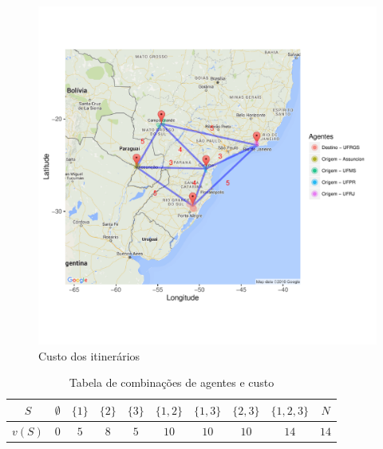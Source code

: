 \documentclass[
	article,			        %
	11pt,				          %
	oneside,			        %
	a4paper,			        %
	english,			        %
	brazil,				        %
	sumario=tradicional
]{abntex2}\usepackage[]{graphicx}\usepackage[]{color}
\makeatletter
\def\maxwidth{ %
  \ifdim\Gin@nat@width>\linewidth
    \linewidth
  \else
    \Gin@nat@width
  \fi
}
\newenvironment{knitrout}{}{} %
\makeatother
\begin{document}
\begin{knitrout}
\color{fgcolor}\begin{figure}[H]

{\centering \includegraphics[width=\maxwidth]{figure/unnamed-chunk-2-1} 

}

\caption[Custo dos itinerários]{Custo dos itinerários}\label{fig:unnamed-chunk-2}
\end{figure}


\end{knitrout}

\begin{table}[!h]
  \centering
  \caption{Tabela de combinações de agentes e custo}
  \label{Tab1}
  \begin{tabular}{@{}cccccccccc@{}}
  \toprule
    $S$    & $\emptyset$ & $\{1\}$ & $\{2\}$ & $\{3\}$ & $\{1,2\}$ & $\{1,3\}$ & $\{2,3\}$ &     $\{1,2,3\}$ & $N$  \\ \midrule
    $v(S)$ & $0$         & $5$     & $8$     & $5$     & $10$      & $10$      & $10$      &     $14$        & $14$ \\ \bottomrule
  \end{tabular}
\end{table}

\end{document}
